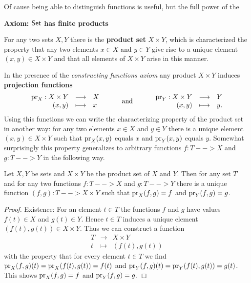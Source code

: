 	Of cause being able to distinguish functions is useful, but the full power of the 

	\begin{mdframed}[skipabove=1em, skipbelow=1em]
		\textbf{Axiom: $\textsf{Set}$ has finite products}
		
		For any two sets $X,Y$ there is the \textbf{product set} $X \times Y$, which is characterized the property that any two elements $x\in X$ and $y \in Y$ give rise to a unique element $(x,y) \in X \times Y$ and that all elements of $X \times Y$ arise in this manner.
	\end{mdframed}

	In the presence of the \textit{constructing functions axiom} any product $X \times Y$ induces \textbf{projection functions}
	\begin{equation*}
		\begin{array}{rcl}
			\operatorname{pr}_X:X \times Y & \longrightarrow & X\\
			(x,y) & \longmapsto & x
		\end{array}
		\hspace{1cm}\text{and}\hspace{1cm}
		\begin{array}{rcl}
			\operatorname{pr}_Y:X \times Y & \longrightarrow & Y\\
			(x,y) & \longmapsto & y.
		\end{array}
	\end{equation*}
	Using this functions we can write the characterizing property of the product set in another way: for any two elements $x \in X$ and $y \in Y$ there is a unique element $(x,y) \in X \times Y$ such that $\operatorname{pr}_X(x,y)$ equals $x$ and $\operatorname{pr}_Y(x,y)$ equals $y$. Somewhat surprisingly this property generalizes to arbitrary functions $f:T --> X$ and $g: T --> Y$ in the following way.

	\begin{lemma}
		Let $X,Y$ be sets and $X \times Y$ be the product set of $X$ and $Y$. Then for any set $T$ and for any two functions $f:T --> X$ and $g: T --> Y$ there is a unique function $(f,g): T --> X \times Y$ such that $\operatorname{pr}_X(f,g)=f$ and $\operatorname{pr}_Y(f,g)=g$.
	\end{lemma}
	\begin{proof}
		Existence: For an element $t \in T$ the functions $f$ and $g$ have values $f(t) \in X$ and $g(t) \in Y$. Hence $t \in T$ induces a unique element $(f(t),g(t)) \in X \times Y$. Thus we can construct a function
		\begin{equation*}
			\begin{array}{ccc}
				T & \longrightarrow & X \times Y\\
				t & \longmapsto & (f(t),g(t))
			\end{array}
		\end{equation*}
		with the property that for every element $t \in T$ we find $\operatorname{pr}_X(f,g)(t) = \operatorname{pr}_X(f(t),g(t)) = f(t)$ and $\operatorname{pr}_Y(f,g)(t) = \operatorname{pr}_Y(f(t),g(t)) = g(t)$. This shows $\operatorname{pr}_X(f,g) = f$ and $\operatorname{pr}_Y(f,g) = g$.
	\end{proof}


